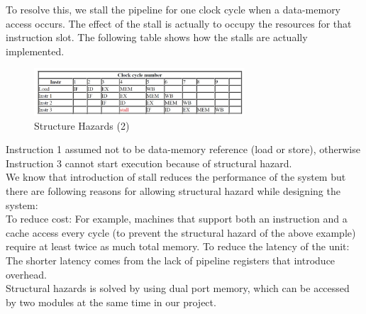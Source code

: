 \documentclass[12pt,a4paper]{report}
\begin{document}
To resolve this, we stall the pipeline for one clock cycle when a data-memory access occurs. The effect of the stall is actually to occupy the resources for that instruction slot. The following table shows how the stalls are actually implemented.\\
\begin{figure}[h]
  \centering
  \includegraphics[width=0.7\textwidth]{SH2}
  \caption{Structure Hazards (2)}
  \label{fig:sh2}
\end{figure}
Instruction 1 assumed not to be data-memory reference (load or store), otherwise Instruction 3 cannot start execution because of structural hazard. \\
We know that introduction of stall reduces the performance of the system but there are following reasons for allowing structural hazard while designing the system: \\
To reduce cost: For example, machines that support both an instruction and a cache access every cycle (to prevent the structural hazard of the above example) require at least twice as much total memory. To reduce the latency of the unit: The shorter latency comes from the lack of pipeline registers that introduce overhead. \\
Structural hazards is solved by using dual port memory, which can be accessed by two modules at the same time in our project.
\end{document}
